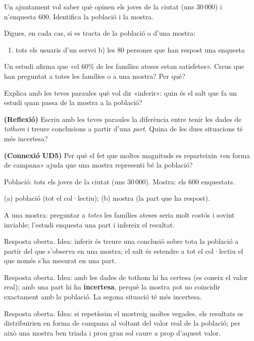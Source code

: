 \begin{exercicis}
\begin{exlist}
  \item Un ajuntament vol saber què opinen els joves de la ciutat (uns $30\,000$) i
        n'enquesta $600$. Identifica la població i la mostra.
  \item Digues, en cada cas, si es tracta de la població o d'una mostra:
        \begin{enumerate}[label=\alph*), leftmargin=1.6em, topsep=2pt]
          \item tots els usuaris d'un servei \hfill b) les $80$ persones que han respost
                una enquesta
        \end{enumerate}
  \item Un estudi afirma que «el $60\%$ de les famílies ateses estan satisfetes». Creus
        que han preguntat a totes les famílies o a una mostra? Per què?
  \item Explica amb les teves paraules què vol dir «inferir»: quin és el salt que fa un
        estudi quan passa de la mostra a la població?
  \item \textbf{(Reflexió)} Escriu amb les teves paraules la diferència entre tenir les
        dades de \emph{tothom} i treure conclusions a partir d'una \emph{part}. Quina de
        les dues situacions té més incertesa?
  \item \textbf{(Connexió UD5)} Per què el fet que moltes magnituds es reparteixin «en
        forma de campana» ajuda que una mostra representi bé la població?
\end{exlist}
\end{exercicis}

\begin{solucions}
\begin{sollist}
  \item Població: tots els joves de la ciutat (uns $30\,000$). Mostra: els $600$
        enquestats.
  \item (a) població (tot el col·lectiu); (b) mostra (la part que ha respost).
  \item A una mostra: preguntar a \emph{totes} les famílies ateses seria molt costós i
        sovint inviable; l'estudi enquesta una part i infereix el resultat.
  \item Resposta oberta. Idea: inferir és treure una conclusió sobre tota la població a
        partir del que s'observa en una mostra; el salt és estendre a tot el col·lectiu el
        que només s'ha mesurat en una part.
  \item Resposta oberta. Idea: amb les dades de tothom hi ha certesa (es coneix el valor
        real); amb una part hi ha \textbf{incertesa}, perquè la mostra pot no coincidir
        exactament amb la població. La segona situació té més incertesa.
  \item Resposta oberta. Idea: si repetíssim el mostreig moltes vegades, els resultats es
        distribuirien en forma de campana al voltant del valor real de la població; per
        això una mostra ben triada i prou gran sol caure a prop d'aquest valor.
\end{sollist}
\end{solucions}
